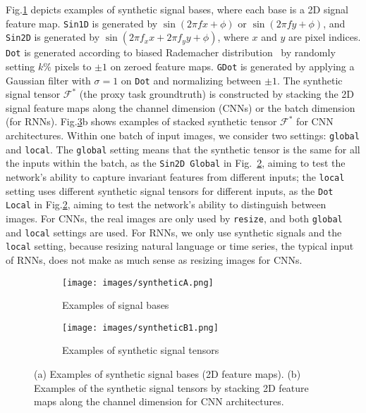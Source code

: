 \documentclass{article}
\begin{document}
Fig.\ref{fig:signalA} depicts examples of synthetic signal bases, where each base is a 2D signal feature map.
\texttt{Sin1D} is generated by $\sin(2{\pi}fx + \phi)$ or $\sin(2{\pi}fy + \phi)$, and
\texttt{Sin2D} is generated by $\sin(2{\pi}f_xx + 2{\pi}f_yy+\phi)$,
where $x$ and $y$ are pixel indices.
\texttt{Dot} is generated according to biased Rademacher distribution~\cite{montgomery1990distribution} by randomly setting $k\%$ pixels to $\pm 1$ on zeroed feature maps. 
\texttt{GDot} is generated by applying a Gaussian filter with $\sigma = 1$ on \texttt{Dot} and normalizing between $\pm 1$.
The synthetic signal tensor $\mathcal{F}^{*}$ (the proxy task groundtruth) is constructed by stacking the 2D signal feature maps along the channel dimension (CNNs) or the batch dimension (for RNNs).
Fig.\ref{fig:signals}b shows examples of stacked synthetic tensor $\mathcal{F}^{*}$ for CNN architectures.
Within one batch of input images, we consider two settings: \texttt{global} and \texttt{local}.
The \texttt{global} setting means that the synthetic tensor is the same for all the inputs within the batch, as the \texttt{Sin2D\,Global} in Fig.~\ref{fig:signalB}, aiming to test the network's ability to capture invariant features from different inputs; the \texttt{local} setting uses different synthetic signal tensors for different inputs, as the \texttt{Dot\,Local} in Fig.\ref{fig:signalB}, aiming to test the network's ability to distinguish between images.
For CNNs, the real images are only used by \texttt{resize}, and both \texttt{global} and \texttt{local} settings are used.
For RNNs, we only use synthetic signals and the \texttt{local} setting, because resizing natural language or time series, the typical input of RNNs, does not make as much sense as resizing images for CNNs. 

\begin{figure}
\vspace{-8pt}
     \centering
     \begin{subfigure}[b]{0.36\textwidth}
         \centering
         \texttt{[image: images/syntheticA.png]}
         \caption{Examples of signal bases}
         \label{fig:signalA}
     \end{subfigure}
     \hfill
     \begin{subfigure}[b]{0.61\textwidth}
         \centering
         \texttt{[image: images/syntheticB1.png]}
         \caption{Examples of synthetic signal tensors}
         \label{fig:signalB}
     \end{subfigure}
        \caption{(a) Examples of synthetic signal bases (2D feature maps). (b) Examples of the synthetic signal tensors by stacking 2D feature maps along the channel dimension for CNN architectures. }\label{fig:signals}
        \vspace{-8pt}
\end{figure}
\end{document}
